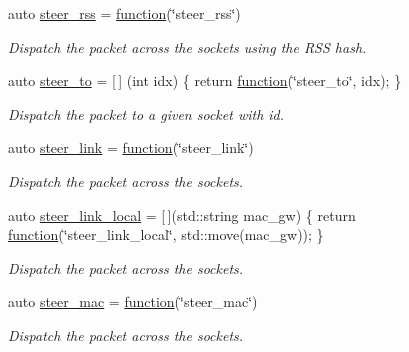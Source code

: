 \begin{DoxyCompactItemize}
auto \hyperlink{namespacepfq_1_1lang_1_1anonymous__namespace_02default_8hpp_03_ae5f71a205afe1a8e3ed959d4c555fcb9}{steer\+\_\+rss} = \hyperlink{namespacepfq_1_1lang_a1a4638059d700ae08d0ca63886ff2bb3}{function}(\char`\"{}steer\+\_\+rss\char`\"{})
\begin{DoxyCompactList}\small\item\em Dispatch the packet across the sockets using the R\+SS hash. \end{DoxyCompactList}\item 
auto \hyperlink{namespacepfq_1_1lang_1_1anonymous__namespace_02default_8hpp_03_a4980fea0af16a26df90f252b5ae21113}{steer\+\_\+to} = \mbox{[}$\,$\mbox{]} (int idx) \{ return \hyperlink{namespacepfq_1_1lang_a1a4638059d700ae08d0ca63886ff2bb3}{function}(\char`\"{}steer\+\_\+to\char`\"{}, idx); \}
\begin{DoxyCompactList}\small\item\em Dispatch the packet to a given socket with id. \end{DoxyCompactList}\item 
auto \hyperlink{namespacepfq_1_1lang_1_1anonymous__namespace_02default_8hpp_03_ac1f3f9a2caf886a1441e62860a4ca058}{steer\+\_\+link} = \hyperlink{namespacepfq_1_1lang_a1a4638059d700ae08d0ca63886ff2bb3}{function}(\char`\"{}steer\+\_\+link\char`\"{})
\begin{DoxyCompactList}\small\item\em Dispatch the packet across the sockets. \end{DoxyCompactList}\item 
auto \hyperlink{namespacepfq_1_1lang_1_1anonymous__namespace_02default_8hpp_03_a6bcbd11933d00917b62ef72890a98c3c}{steer\+\_\+link\+\_\+local} = \mbox{[}$\,$\mbox{]}(std\+::string mac\+\_\+gw) \{ return \hyperlink{namespacepfq_1_1lang_a1a4638059d700ae08d0ca63886ff2bb3}{function}(\char`\"{}steer\+\_\+link\+\_\+local\char`\"{}, std\+::move(mac\+\_\+gw)); \}
\begin{DoxyCompactList}\small\item\em Dispatch the packet across the sockets. \end{DoxyCompactList}\item 
auto \hyperlink{namespacepfq_1_1lang_1_1anonymous__namespace_02default_8hpp_03_ad51e91e3b485c729ac1ba39a46e337a0}{steer\+\_\+mac} = \hyperlink{namespacepfq_1_1lang_a1a4638059d700ae08d0ca63886ff2bb3}{function}(\char`\"{}steer\+\_\+mac\char`\"{})
\begin{DoxyCompactList}\small\item\em Dispatch the packet across the sockets. \end{DoxyCompactList}\item 

\end{DoxyCompactItemize}
